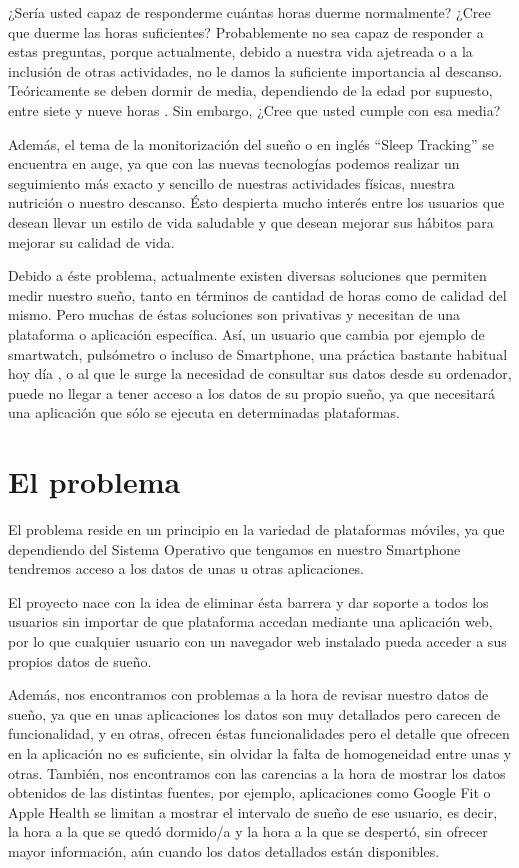 \documentclass[11pt,openany]{book}
\begin{document}
¿Sería usted capaz de responderme cuántas horas duerme normalmente? ¿Cree que duerme las horas suficientes? Probablemente no sea capaz de responder a estas preguntas, porque actualmente, debido a nuestra vida ajetreada o a la inclusión de otras actividades, no le damos la suficiente importancia al descanso. Teóricamente se deben dormir de media, dependiendo de la edad por supuesto, entre siete y nueve horas \cite{1}. Sin embargo, ¿Cree que usted cumple con esa media?

Además, el tema de la monitorización del sueño o en inglés ``Sleep Tracking'' se encuentra en auge, ya que con las nuevas tecnologías podemos realizar un seguimiento más exacto y sencillo de nuestras actividades físicas, nuestra nutrición o nuestro descanso. Ésto despierta mucho interés entre los usuarios que desean llevar un estilo de vida saludable y que desean mejorar sus hábitos para mejorar su calidad de vida. 

Debido a éste problema, actualmente existen diversas soluciones que permiten medir nuestro sueño, tanto en términos de cantidad de horas como de calidad del mismo. Pero muchas de éstas soluciones son privativas y necesitan de una plataforma o aplicación específica. Así, un usuario que cambia por ejemplo de smartwatch, pulsómetro o incluso de Smartphone, una práctica bastante habitual hoy día \cite{17}, o al que le surge la necesidad de consultar sus datos desde su ordenador, puede no llegar a tener acceso a los datos de su propio sueño, ya que necesitará una aplicación que sólo se ejecuta en determinadas plataformas. 

\section{El problema}

El problema reside en un principio en la variedad de plataformas móviles, ya que dependiendo del Sistema Operativo que tengamos en nuestro Smartphone tendremos acceso a los datos de unas u otras aplicaciones. 

El proyecto nace con la idea de eliminar ésta barrera y dar soporte a todos los usuarios sin importar de que plataforma accedan mediante una aplicación web, por lo que cualquier usuario con un navegador web instalado pueda acceder a sus propios datos de sueño.

Además, nos encontramos con problemas a la hora de revisar nuestro datos de sueño, ya que en unas aplicaciones los datos son muy detallados pero carecen de funcionalidad, y en otras, ofrecen éstas funcionalidades pero el detalle que ofrecen en la aplicación no es suficiente, sin olvidar la falta de homogeneidad entre unas y otras. También, nos encontramos con las carencias a la hora de mostrar los datos obtenidos de las distintas fuentes, por ejemplo, aplicaciones como Google Fit o Apple Health se limitan a mostrar el intervalo de sueño de ese usuario, es decir, la hora a la que se quedó dormido/a y la hora a la que se despertó, sin ofrecer mayor información, aún cuando los datos detallados están disponibles.
\end{document}

